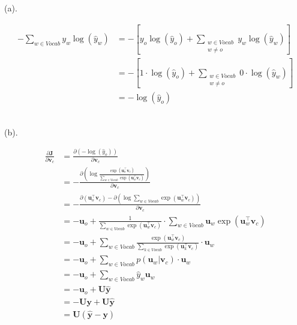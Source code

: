 \documentclass{article}
\begin{document}
(a). 

\begin{equation*}
  \begin{aligned}
  -\sum_{w \in Vocab} y_{w} \log \left(\hat{y}_{w}\right)& = - \left[ y_{o} \log \left(\hat{y}_{o}\right) + \sum_{\substack{w \in Vocab \\ w \neq o}} y_{w} \log \left(\hat{y}_{w}\right) \right] \\
  & = - \left[ 1 \cdot \log \left(\hat{y}_{o}\right) + \sum_{\substack{w \in Vocab \\ w \neq o}} 0 \cdot \log \left(\hat{y}_{w}\right) \right] \\
  & = - \log \left( \hat{y}_{o} \right) 
  \end{aligned} 
\end{equation*}

~\\

(b). 

\begin{equation*}
  \begin{aligned}
    \frac{\partial \boldsymbol{J}}{\partial \boldsymbol{v}_c} &= \frac{\partial (- \log (\hat{y}_o))}{\partial \boldsymbol{v}_c} \\ 
    & = - \frac{\partial (\log \frac{\exp (\boldsymbol{u}_{o}^{\intercal} \boldsymbol{v}_{c})}{\sum_{w \in Vocab} \exp (\boldsymbol{u}_{w}^{\intercal}\boldsymbol{v}_{c})})}{\partial \boldsymbol{v}_c} \\ 
    & = - \frac{\partial (\boldsymbol{u}_{o}^{\intercal} \boldsymbol{v}_{c}) - \partial (\log \sum_{w \in Vocab} \exp (\boldsymbol{u}_{w}^{\intercal}\boldsymbol{v}_{c}) )}{\partial \boldsymbol{v}_c} \\ 
    & = - \boldsymbol{u}_{o} + \frac{1}{\sum_{w \in Vocab} \exp (\boldsymbol{u}_{w}^{\intercal}\boldsymbol{v}_{c}) } \cdot \sum_{w \in Vocab} \boldsymbol{u}_{w} \exp (\boldsymbol{u}_{w}^{\intercal}\boldsymbol{v}_{c}) \\
    & = - \boldsymbol{u}_{o} + \sum_{w \in Vocab}\frac{\exp (\boldsymbol{u}_{w}^{\intercal}\boldsymbol{v}_{c})}{\sum_{k \in Vocab} \exp (\boldsymbol{u}_{k}^{\intercal}\boldsymbol{v}_{c})} \cdot \boldsymbol{u}_{w} \\
    & = - \boldsymbol{u}_{o} + \sum_{w \in Vocab} p(\boldsymbol{u}_{w}|\boldsymbol{v}_{c}) \cdot \boldsymbol{u}_{w} \\
    & = - \boldsymbol{u}_{o} + \sum_{w \in Vocab} \hat{y}_{w} \boldsymbol{u}_{w} \\
    & = - \boldsymbol{u}_{o} + \boldsymbol{U}\hat{\boldsymbol{y}} \\
    & = - \boldsymbol{U}\boldsymbol{y} + \boldsymbol{U}\hat{\boldsymbol{y}} \\
    & = \boldsymbol{U} (\hat{\boldsymbol{y}} - \boldsymbol{y})
  \end{aligned}
\end{equation*}
\end{document}
